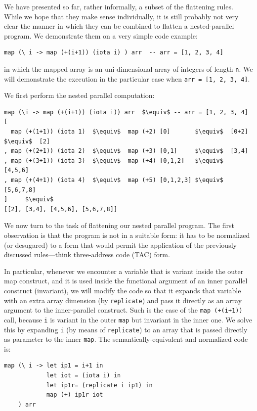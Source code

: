 \documentclass[acmsmall,review]{acmart}\settopmatter{printfolios=true,printccs=false,printacmref=false}
\begin{document}
We have presented so far, rather informally, a subset of
the flattening rules. While we hope that they make sense
individually, it is still probably not very clear the manner
in which they can be combined to flatten a nested-parallel
program. We demonstrate them on a very simple code example:
\begin{lstlisting}[mathescape=true]
map (\ i -> map (+(i+1)) (iota i) ) arr  -- arr = [1, 2, 3, 4]
\end{lstlisting}\vspace{-2ex}
in which the mapped array is an uni-dimensional array of integers
of length {\tt n}. We will demonstrate the execution in the
particular case when {\tt arr = [1, 2, 3, 4]}.

We first perform the nested parallel computation:
\begin{lstlisting}[mathescape=true]
map (\i -> map (+(i+1)) (iota i)) arr  $\equiv$ -- arr = [1, 2, 3, 4]
[ 
  map (+(1+1)) (iota 1)  $\equiv$  map (+2) [0]       $\equiv$  [0+2]  $\equiv$  [2]
, map (+(2+1)) (iota 2)  $\equiv$  map (+3) [0,1]     $\equiv$  [3,4]  
, map (+(3+1)) (iota 3)  $\equiv$  map (+4) [0,1,2]   $\equiv$  [4,5,6]
, map (+(4+1)) (iota 4)  $\equiv$  map (+5) [0,1,2,3] $\equiv$  [5,6,7,8]
]     $\equiv$
[[2], [3,4], [4,5,6], [5,6,7,8]]
\end{lstlisting}\vspace{-2ex}

We now turn to the task of flattening our nested parallel program.
The first observation is that the program is not in a suitable form:
it has to be normalized (or desugared) to a form that would permit 
the application of the previously discussed rules---think three-address
code (TAC) form.

In particular, whenever we encounter a variable that is variant inside
the outer map construct, and it is used inside the functional argument
of an inner parallel construct (invariant), we will modify the code so 
that it expands that variable with an extra array dimension 
(by \lstinline{replicate}) and pass it directly as an array argument
to the inner-parallel construct. Such is the case of the {\tt map (+(i+1))} 
call, because {\tt i} is variant in the outer \lstinline{map} but
invariant in the inner one. We solve this by expanding {\tt i} 
(by means of \lstinline{replicate}) to an array that 
is passed directly as parameter to the inner \lstinline{map}.
The semantically-equivalent and normalized code is:
\begin{lstlisting}[mathescape=true]
map (\ i -> let ip1 = i+1 in
            let iot = (iota i) in
            let ip1r= (replicate i ip1) in
            map (+) ip1r iot
    ) arr
\end{lstlisting}\vspace{-2ex}
  
\end{document}
